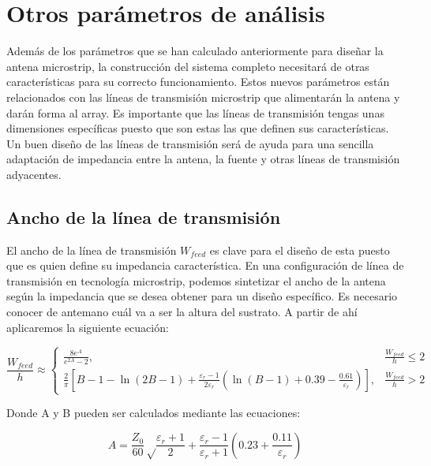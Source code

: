 \section{Otros parámetros de análisis}
\par Además de los parámetros que se han calculado anteriormente para diseñar la antena microstrip, la construcción del sistema completo necesitará de otras características para su correcto funcionamiento. Estos nuevos parámetros están relacionados con las líneas de transmisión microstrip que alimentarán la antena y darán forma al array. Es importante que las líneas de transmisión tengas unas dimensiones específicas puesto que son estas las que definen sus características. Un buen diseño de las líneas de transmisión será de ayuda para una sencilla adaptación de impedancia entre la antena, la fuente y otras líneas de transmisión adyacentes.

\subsection{Ancho de la línea de transmisión}
\par El ancho de la línea de transmisión $W_{feed}$ es clave para el diseño de esta puesto que es quien define su impedancia característica. En una configuración de línea de transmisión en tecnología microstrip, podemos sintetizar el ancho de la antena según la impedancia que se desea obtener para un diseño específico. Es necesario conocer de antemano cuál va a ser la altura del sustrato. A partir de ahí aplicaremos la siguiente ecuación:

\begin{equation}
	\frac{W_{feed}}{h}\approx \begin{cases}
\frac{8e^{A}}{e^{2A}-2}, & \frac{W_{feed}}{h}\leq 2
\\ \frac{2}{\pi}\left [ B-1-\ln(2B-1)+\frac{\varepsilon _{r}-1}{2\varepsilon _{r}}\left ( \ln(B-1)+0.39-\frac{0.61}{\varepsilon _{r}} \right ) \right ], & \frac{W_{feed}}{h}>  2
\end{cases}
	\label{eq:wh}
\end{equation}

\par Donde A y B pueden ser calculados mediante las ecuaciones:

\begin{equation}
	A=\frac{Z_{0}}{60}\sqrt\frac{\varepsilon_{r}+1}{2}+\frac{\varepsilon_{r}-1}{\varepsilon_{r}+1}\left ( 0.23+\frac{0.11}{\varepsilon_{r}} \right ) 
	\label{eq:A}
\end{equation}

